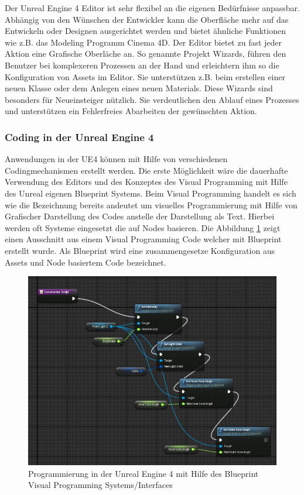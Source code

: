 \documentclass[pagesize, paper=a4, fontsize=12pt, titlepage=true, headings=small, headnosepline, abstractoff, liststotoc, nochapterprefix, plainheadsepline, twoside]{scrreprt}
\begin{document}
Der Unreal Engine 4 Editor ist sehr flexibel an die eigenen Bedürfnisse anpassbar. Abhängig von den Wünschen der Entwickler kann die Oberfläche mehr auf das Entwickeln oder Designen ausgerichtet werden und bietet ähnliche Funktionen wie z.B. das Modeling Programm Cinema 4D. Der Editor bietet zu fast jeder Aktion eine Grafische Oberläche an. So genannte Projekt Wizards, führen den Benutzer bei komplexeren Prozessen an der Hand und erleichtern ihm so die Konfiguration von Assets im Editor. Sie unterstützen z.B. beim erstellen einer neuen Klasse oder dem Anlegen eines neuen Materials. Diese Wizards sind besonders für Neueinsteiger nützlich. Sie verdeutlichen den Ablauf eines Prozesses und unterstützen ein Fehlerfreies Abarbeiten der gewünschten Aktion.

\subsubsection{Coding in der Unreal Engine 4}
Anwendungen in der UE4 können mit Hilfe von verschiedenen Codingmechanismen erstellt werden. Die erste Möglichkeit wäre die dauerhafte Verwendung des Editors und des Konzeptes des Visual Programming mit Hilfe des Unreal eigenen Blueprint Systems. Beim Visual Programming handelt es sich wie die Bezeichnung bereits andeutet um visuelles Programmierung mit Hilfe von Grafischer Darstellung des Codes anstelle der Darstellung als Text. Hierbei werden oft Systeme eingesetzt die auf Nodes basieren. Die Abbildung \ref{UE4Blueprint} zeigt einen Ausschnitt aus einem Visual Programming Code welcher mit Blueprint erstellt wurde. Als Blueprint wird eine zusammengesetze Konfiguration aus Assets und Node basiertem Code bezeichnet.

\begin{figure}[ht]
	\centering
	\includegraphics[width=\linewidth]{Bilder/ue4Blueprint.jpg}
	\caption{Programmierung in der Unreal Engine 4 mit Hilfe des Blueprint Visual Programming Systems/Interfaces}
	\label{UE4Blueprint}	
\end{figure} 
\end{document}
